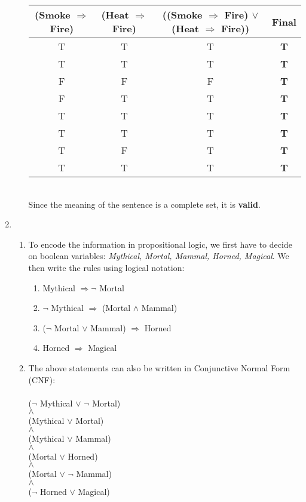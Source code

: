 \documentclass[12pt]{article}
\begin{document}
\begin{enumerate}
\begin{enumerate}
		\begin{tabular}{ | c | c | c | >{\bf}c |}
		\hline
		(Smoke $\Rightarrow$ Fire) & (Heat $\Rightarrow$ Fire) & ((Smoke $\Rightarrow$ Fire) $\lor$ (Heat $\Rightarrow$ Fire)) & Final  \\
		\hline 
		T & T & T & T  \\
		\hline 
		T & T & T & T  \\
		\hline 
		F & F & F & T \\
		\hline 
		F & T & T & T  \\
		\hline 
		T & T & T & T  \\
		\hline 
		T & T & T & T  \\
		\hline 
		T & F & T & T  \\
		\hline 
		T & T & T & T  \\
		\hline 
		\end{tabular}
		\\
		
		Since the meaning of the sentence is a complete set, it is \textbf{valid}.
	\end{enumerate}
	
	\item
	\begin{enumerate}
		\item To encode the information in propositional logic, we first have to decide on boolean variables: \textit{Mythical, Mortal, Mammal, Horned, Magical}. We then write the rules using logical notation:
		\begin{enumerate}
			\item Mythical $\Rightarrow \neg$ Mortal
			\item $\neg$ Mythical $\Rightarrow$ (Mortal $\land$ Mammal)
			\item ($\neg$ Mortal $\lor$ Mammal) $\Rightarrow$ Horned
			\item Horned $\Rightarrow$ Magical
		\end{enumerate}
		
		\item The above statements can also be written in Conjunctive Normal Form (CNF): \\ \\
		($\neg$ Mythical $\lor$ $\neg$ Mortal) \\
		$\land$ \\
		(Mythical $\lor$ Mortal) \\
		$\land$ \\
		(Mythical $\lor$ Mammal) \\
		$\land$ \\
		(Mortal $\lor$ Horned) \\
		$\land$ \\
		(Mortal $\lor$ $\neg$ Mammal) \\
		$\land$ \\
		($\neg$ Horned $\lor$ Magical) \\
		

\end{enumerate}
\end{enumerate}
\end{document}
